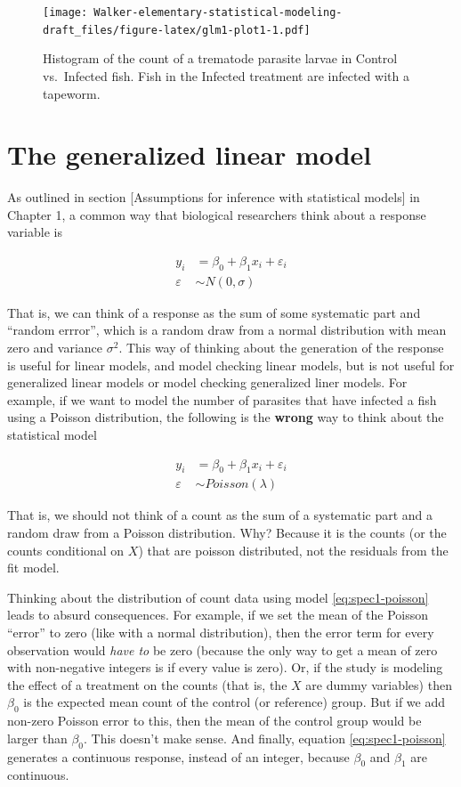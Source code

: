 \documentclass[]{book}
\begin{document}
\begin{figure}
\centering
\texttt{[image: Walker-elementary-statistical-modeling-draft\_files/figure-latex/glm1-plot1-1.pdf]}
\caption{\label{fig:glm1-plot1}Histogram of the count of a trematode
parasite larvae in Control vs.~Infected fish. Fish in the Infected
treatment are infected with a tapeworm.}
\end{figure}

\section{The generalized linear
model}\label{the-generalized-linear-model}

As outlined in section {[}Assumptions for inference with statistical
models{]} in Chapter 1, a common way that biological researchers think
about a response variable is

\begin{align}
y_i &= \beta_0 + \beta_1 x_i + \varepsilon_i \\
\varepsilon &\sim N(0, \sigma)
\label{eq:spec1}
\end{align}

That is, we can think of a response as the sum of some systematic part
and ``random errror'', which is a random draw from a normal distribution
with mean zero and variance \(\sigma^2\). This way of thinking about the
generation of the response is useful for linear models, and model
checking linear models, but is not useful for generalized linear models
or model checking generalized liner models. For example, if we want to
model the number of parasites that have infected a fish using a Poisson
distribution, the following is the \textbf{wrong} way to think about the
statistical model

\begin{align}
y_i &= \beta_0 + \beta_1 x_i + \varepsilon_i\\
\varepsilon &\sim Poisson(\lambda)
\label{eq:spec1-poisson}
\end{align}

That is, we should not think of a count as the sum of a systematic part
and a random draw from a Poisson distribution. Why? Because it is the
counts (or the counts conditional on \(X\)) that are poisson
distributed, not the residuals from the fit model.

Thinking about the distribution of count data using model
\eqref{eq:spec1-poisson} leads to absurd consequences. For example, if we
set the mean of the Poisson ``error'' to zero (like with a normal
distribution), then the error term for every observation would
\emph{have to} be zero (because the only way to get a mean of zero with
non-negative integers is if every value is zero). Or, if the study is
modeling the effect of a treatment on the counts (that is, the \(X\) are
dummy variables) then \(\beta_0\) is the expected mean count of the
control (or reference) group. But if we add non-zero Poisson error to
this, then the mean of the control group would be larger than
\(\beta_0\). This doesn't make sense. And finally, equation
\eqref{eq:spec1-poisson} generates a continuous response, instead of an
integer, because \(\beta_0\) and \(\beta_1\) are continuous.
\end{document}
